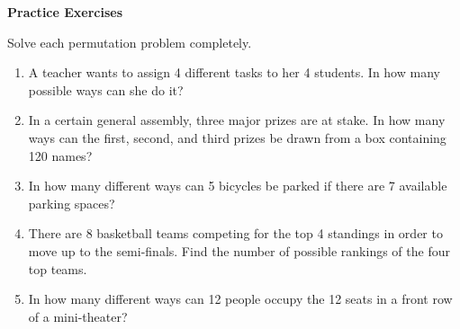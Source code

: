 \textbf{Practice Exercises}

\vspce

Solve each  permutation  problem completely. 

\begin{enumerate}[label = \arabic*. ]
\item A  teacher  wants  to  assign  4  different  tasks  to her  4  students.  In  how many  possible  ways  can she do it?
\item In  a  certain  general  assembly,  three  major prizes are  at  stake.  In  how  many  ways can  the first,  second,  and  third  prizes be  drawn  from  a box  containing  120  names?
\item In  how  many  different  ways can  5  bicycles  be  parked  if  there  are  7 available  parking  spaces?
\item There  are  8  basketball  teams  competing  for  the  top  4  standings in order  to  move  up  to  the  semi-finals. Find  the  number  of  possible rankings of  the  four top  teams.  
\item In  how  many  different  ways  can 12  people  occupy  the  12  seats  in  a front  row  of  a  mini-theater?

\end{enumerate} 




